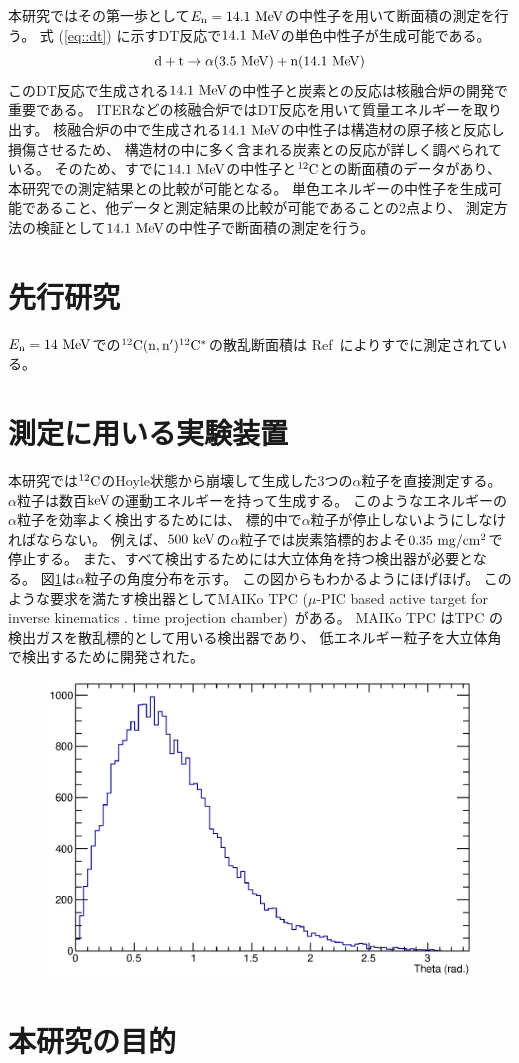 本研究ではその第一歩として$E_{\rm n} = 14.1~{\rm MeV}$の中性子を用いて断面積の測定を行う。
式 (\ref{eq::dt}) に示すDT反応で$14.1~{\rm MeV}$の単色中性子が生成可能である。
\begin{equation}
  {\rm d} + {\rm t} \rightarrow \alpha (3.5~{\rm MeV}) + {\rm n} (14.1~{\rm MeV})
  \label{eq::dt}
\end{equation}
このDT反応で生成される$14.1~{\rm MeV}$の中性子と炭素との反応は核融合炉の開発で重要である。
ITERなどの核融合炉ではDT反応を用いて質量エネルギーを取り出す。
核融合炉の中で生成される$14.1~{\rm MeV}$の中性子は構造材の原子核と反応し損傷させるため、
構造材の中に多く含まれる炭素との反応が詳しく調べられている。
そのため、すでに$14.1~{\rm MeV}$の中性子と${}^{12}{\rm C}$との断面積のデータがあり、本研究での測定結果との比較が可能となる。
単色エネルギーの中性子を生成可能であること、他データと測定結果の比較が可能であることの2点より、
測定方法の検証として$14.1~{\rm MeV}$の中性子で断面積の測定を行う。

\section{先行研究}
$E_{\rm n}=14~{\rm MeV}$での${}^{12}{\rm C}({\rm n},{\rm n}'){}^{12}{\rm C}^{*}$の散乱断面積は
Ref~\cite{takahashietal,kondoetal}によりすでに測定されている。

\section{測定に用いる実験装置}
本研究では${}^{12}{\rm C}$のHoyle状態から崩壊して生成した3つの$\alpha$粒子を直接測定する。
$\alpha$粒子は数百${\rm keV}$の運動エネルギーを持って生成する。
このようなエネルギーの$\alpha$粒子を効率よく検出するためには、
標的中で$\alpha$粒子が停止しないようにしなければならない。
例えば、$500~{\rm keV}$の$\alpha$粒子では炭素箔標的およそ$0.35~{\rm mg/cm^2}$で停止する。
また、すべて検出するためには大立体角を持つ検出器が必要となる。%
図\ref{fig::alpha_theta_dist}は$\alpha$粒子の角度分布を示す。
この図からもわかるようにほげほげ。
このような要求を満たす検出器としてMAIKo TPC ($\mu$-PIC based active target for inverse kinematics .
time projection chamber)~\cite{maiko, mupic}がある。
MAIKo TPC はTPC の検出ガスを散乱標的として用いる検出器であり、
低エネルギー粒子を大立体角で検出するために開発された。
\begin{figure}
  \centering
  \includegraphics[clip, width=0.7\columnwidth]{eps/alpha_theta_dist.eps}
  \caption{}
  \label{fig::alpha_theta_dist}
\end{figure}

\section{本研究の目的}
\label{thiswork}
